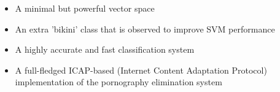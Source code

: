 \documentclass[portrait,a0paper,final,margin=6em]{baposter}
\begin{document}
\begin{poster}
{\begin{itemize}
		\begin{itemize}
			\item A minimal but powerful vector space
			\item An extra 'bikini' class that is observed to improve SVM performance
			\item A highly accurate and fast classification system
			\item A full-fledged ICAP-based (Internet Content Adaptation Protocol) implementation of the pornography elimination system
		\end{itemize}
	\end{itemize}
	\vspace{1 cm}
  }
\end{poster}
\end{document}
